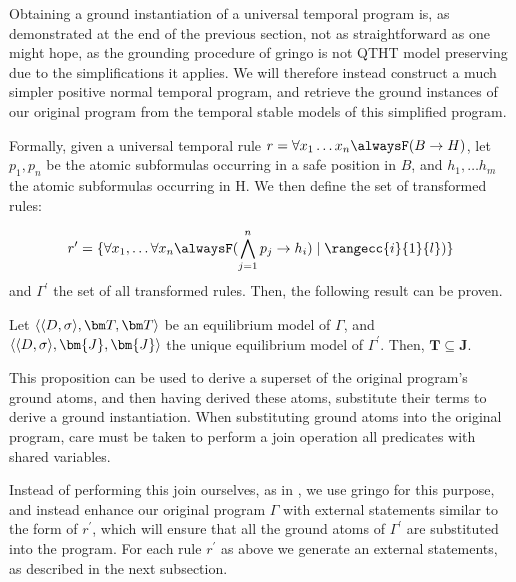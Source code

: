 Obtaining a ground instantiation of a universal temporal program is,
as demonstrated at the end of the previous section, not as
straightforward as one might hope, as the grounding procedure of
gringo is not QTHT model preserving due to the simplifications it
applies. We will therefore instead construct a much simpler positive
normal temporal program, and retrieve the ground instances of our
original program from the temporal stable models of this simplified
program.

Formally, given a universal temporal rule
$r=\forall x_1 \dots x_n \alwaysF(B \rightarrow H)$, let $p_1, p_n$ be
the atomic subformulas occurring in a safe position in $B$, and
$h_1, \dots h_m$ the atomic subformulas occurring in H. We then
define the set of transformed rules:

\begin{equation*}
r^{\prime}=\{ \forall x_1, \dots \forall x_n 
\alwaysF(\bigwedge_{j=1}^{n}p_j \rightarrow h_i) \mid \rangecc{i}{1}{l} )\}
\end{equation*}
and $\Gamma^{\prime}$ the set of all transformed rules. Then, the
following result can be proven.

\begin{proposition}
Let $\qttandt$ be an equilibrium model of $\Gamma$, and $\langle \dsigma, \bm{J},\bm{J} \rangle$ the unique equilibrium model of $\Gamma^{\prime}$. Then, $\bm{T} \subseteq \bm{J}$.
\end{proposition}

This proposition can be used to derive a superset of the original
program's ground atoms, and then having derived these atoms,
substitute their terms to derive a ground instantiation. When
substituting ground atoms into the original program, care must be
taken to perform a join operation all predicates with shared
variables. 

Instead of performing this join ourselves, as in \cite{agcapevidi17a},
we use gringo for this purpose, and instead enhance our original
program $\Gamma$ with external statements similar to the form of
$r^{\prime}$, which will ensure that all the ground atoms of
$\Gamma^{\prime}$ are substituted into the program. For each rule
$r^{\prime}$ as above we generate an external statements, as described in the next subsection.
